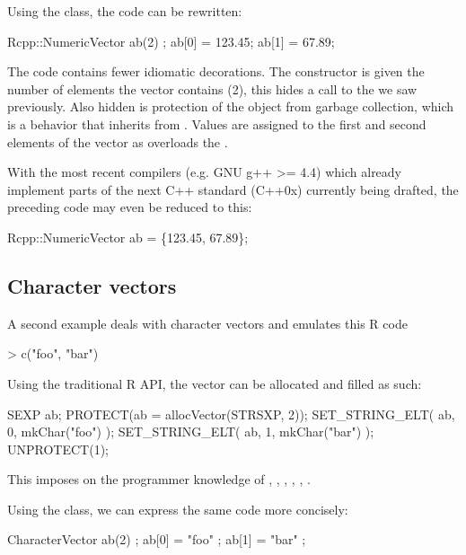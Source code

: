 Using the  class, the code can be rewritten: 

\begin{example}
Rcpp::NumericVector ab(2) ;
ab[0] = 123.45;
ab[1] = 67.89;
\end{example}

The code contains fewer idiomatic decorations. The 
constructor is given the number of elements the vector contains (2), this
hides a call to the  we saw previously. Also hidden is
protection of the object from garbage collection, which is a behavior that
 inherits from .  Values are assigned to
the first and second elements of the vector as  overloads
the .

With the most recent compilers (e.g. GNU g++ >= 4.4) which already implement
parts of the next C++ standard (C++0x) currently being drafted, the preceding
code may even be reduced to this:

\begin{example}
Rcpp::NumericVector ab = \{123.45, 67.89\};
\end{example}

\subsection{Character vectors}

A second example deals with character vectors and emulates this R code

\begin{example}
> c("foo", "bar")
\end{example}

Using the traditional R API, the vector can be allocated and filled as such:

\begin{example}
SEXP ab;
PROTECT(ab = allocVector(STRSXP, 2));
SET_STRING_ELT( ab, 0, mkChar("foo") );
SET_STRING_ELT( ab, 1, mkChar("bar") );
UNPROTECT(1);
\end{example}

This imposes on the programmer knowledge of , , 
, , , . 

Using the  class, we can express the same
code more concisely:

\begin{example}
CharacterVector ab(2) ;
ab[0] = "foo" ;
ab[1] = "bar" ;
\end{example}


